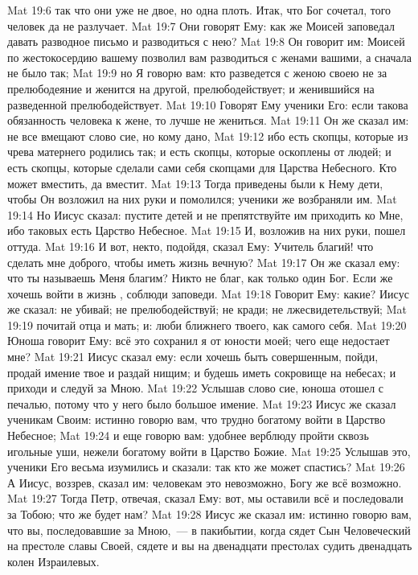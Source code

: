\vs Mat 19:6 так что они уже не двое, но одна плоть. Итак, что Бог сочетал, того человек да не разлучает.
\vs Mat 19:7 Они говорят Ему: как же Моисей заповедал давать разводное письмо и разводиться с нею?
\vs Mat 19:8 Он говорит им: Моисей по жестокосердию вашему позволил вам разводиться с женами вашими, а сначала не было так;
\vs Mat 19:9 но Я говорю вам: кто разведется с женою своею не за прелюбодеяние и женится на другой,  прелюбодействует; и женившийся на разведенной прелюбодействует.
\vs Mat 19:10 Говорят Ему ученики Его: если такова обязанность человека к жене, то лучше не жениться.
\vs Mat 19:11 Он же сказал им: не все вмещают слово сие, но кому дано,
\vs Mat 19:12 ибо есть скопцы, которые из чрева матернего родились так; и есть скопцы, которые оскоплены от людей; и есть скопцы, которые сделали сами себя скопцами для Царства Небесного. Кто может вместить, да вместит.
\rsbpar\vs Mat 19:13 Тогда приведены были к Нему дети, чтобы Он возложил на них руки и помолился; ученики же возбраняли им.
\vs Mat 19:14 Но Иисус сказал: пустите детей и не препятствуйте им приходить ко Мне, ибо таковых есть Царство Небесное.
\vs Mat 19:15 И, возложив на них руки, пошел оттуда.
\rsbpar\vs Mat 19:16 И вот, некто, подойдя, сказал Ему: Учитель благий! что сделать мне доброго, чтобы иметь жизнь вечную?
\vs Mat 19:17 Он же сказал ему: что ты называешь Меня благим? Никто не благ, как только один Бог. Если же хочешь войти в жизнь , соблюди заповеди.
\vs Mat 19:18 Говорит Ему: какие? Иисус же сказал: не убивай; не прелюбодействуй; не кради; не лжесвидетельствуй;
\vs Mat 19:19 почитай отца и мать; и: люби ближнего твоего, как самого себя.
\vs Mat 19:20 Юноша говорит Ему: всё это сохранил я от юности моей; чего еще недостает мне?
\vs Mat 19:21 Иисус сказал ему: если хочешь быть совершенным, пойди, продай имение твое и раздай нищим; и будешь иметь сокровище на небесах; и приходи и следуй за Мною.
\vs Mat 19:22 Услышав слово сие, юноша отошел с печалью, потому что у него было большое имение.
\vs Mat 19:23 Иисус же сказал ученикам Своим: истинно говорю вам, что трудно богатому войти в Царство Небесное;
\vs Mat 19:24 и еще говорю вам: удобнее верблюду пройти сквозь игольные уши, нежели богатому войти в Царство Божие.
\vs Mat 19:25 Услышав это, ученики Его весьма изумились и сказали: так кто же может спастись?
\vs Mat 19:26 А Иисус, воззрев, сказал им: человекам это невозможно, Богу же всё возможно.
\rsbpar\vs Mat 19:27 Тогда Петр, отвечая, сказал Ему: вот, мы оставили всё и последовали за Тобою; что же будет нам?
\vs Mat 19:28 Иисус же сказал им: истинно говорю вам, что вы, последовавшие за Мною,~--- в пакибытии, когда сядет Сын Человеческий на престоле славы Своей, сядете и вы на двенадцати престолах судить двенадцать колен Израилевых.
